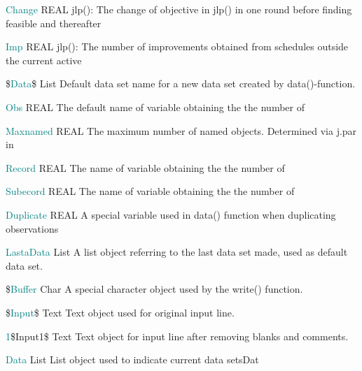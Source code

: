 \noindent \textcolor{teal}{Change} \tabto{25mm }  REAL \tabto{45mm }   \textcolor{VioletRed}{jlp}(): The change of objective in \textcolor{VioletRed}{jlp}()  in one round before finding feasible and thereafter


\noindent \textcolor{teal}{Imp} \tabto{25mm }  REAL \tabto{45mm }   \textcolor{VioletRed}{jlp}(): The number of improvements obtained from schedules outside the current active


\noindent \$\textcolor{teal}{Data}\$  \tabto{25mm }   List \tabto{45mm }   Default data set name for a new data set created by \textcolor{VioletRed}{data}()-function.





\noindent \textcolor{teal}{Obs} \tabto{25mm }   REAL  \tabto{45mm }   The default name of variable obtaining the the number of

\noindent \textcolor{teal}{Maxnamed}  \tabto{25mm }  REAL \tabto{45mm }   The maximum number of named objects. Determined via j.par in


\noindent \textcolor{teal}{Record} \tabto{25mm }   REAL  \tabto{45mm }   The name of variable obtaining the the number of


\noindent \textcolor{teal}{Subecord} \tabto{25mm }   REAL  \tabto{45mm }   The name of variable obtaining the the number of


\noindent \textcolor{teal}{Duplicate} \tabto{25mm }   REAL \tabto{45mm }   A special variable used in \textcolor{VioletRed}{data}() function when duplicating observations


\noindent \textcolor{teal}{LastaData}  \tabto{25mm }  List \tabto{45mm }  	A list object referring to the last data set made, used as default data set.


\noindent \$\textcolor{teal}{Buffer} \tabto{25mm }  Char \tabto{45mm }   A special character object used by the \textcolor{VioletRed}{write}() function.


\noindent \$\textcolor{teal}{Input}\$ \tabto{25mm }   Text  \tabto{45mm }   Text object used for original input line.

\noindent \textcolor{teal}{1}\$Input1\$  \tabto{25mm }  Text \tabto{45mm }   Text object for input line after removing blanks and comments.


\noindent \textcolor{teal}{Data}  \tabto{25mm }  List \tabto{45mm }    List object used to indicate current data setsDat

































